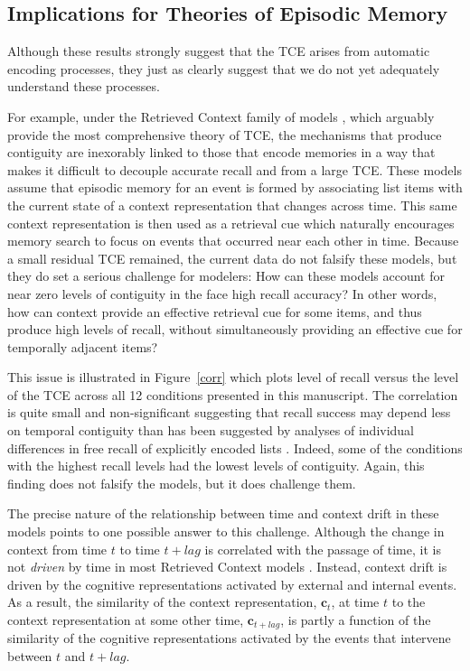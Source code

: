 \documentclass[man,natbib,floatsintext]{apa6} %
\begin{document}
\subsection{Implications for Theories of Episodic Memory}
Although these results strongly suggest that the TCE arises from automatic encoding processes, they just as clearly suggest that we do not yet adequately understand these processes.

For example, under the Retrieved Context family of models \citep[e.g.,][]{PolyEtal09,LohnEtal14,HealKaha15}, which arguably provide the most comprehensive theory of TCE, the mechanisms that produce contiguity are inexorably linked to those that encode memories in a way that makes it difficult to decouple accurate recall and from a large TCE. These models assume that episodic memory for an event is formed by associating list items with the current state of a context representation that changes across time. This same context representation is then used as a retrieval cue which naturally encourages memory search to focus on events that occurred near each other in time. Because a small residual TCE remained, the current data do not falsify these models, but they do set a serious challenge for modelers: How can these models account for near zero levels of contiguity in the face high recall accuracy? In other words, how can context provide an effective retrieval cue for some items, and thus produce high levels of recall, without simultaneously providing an effective cue for temporally adjacent items?

This issue is illustrated in Figure~\ref{corr} which plots level of recall versus the level of the TCE across all 12 conditions presented in this manuscript. The correlation is quite small and non-significant \color{black} suggesting that recall success may depend less on temporal contiguity than has been suggested by analyses of individual differences in free recall of explicitly encoded lists \citep{SedeEtal10,HealEtal14}. Indeed, some of the conditions with the highest recall levels had the lowest levels of contiguity. Again, this finding does not falsify the models, but it does challenge them. 

The precise nature of the relationship between time and context drift in these models points to one possible answer to this challenge. Although the change in context from time $t$ to time $t+lag$ is correlated with the passage of time, it is not \emph{driven} by time in most Retrieved Context models \citep[but see][for a model in which drift is driven by time]{HowaEtal14a}. Instead, context drift is driven by the cognitive representations activated by external and internal events. As a result, the similarity of the context representation, $\mathbf{c}_t$, at time $t$ to the context representation at some other time, $\mathbf{c}_{t+lag}$, is partly a function of the similarity of the cognitive representations activated by the events that intervene between $t$ and $t+lag$. 
\end{document}
